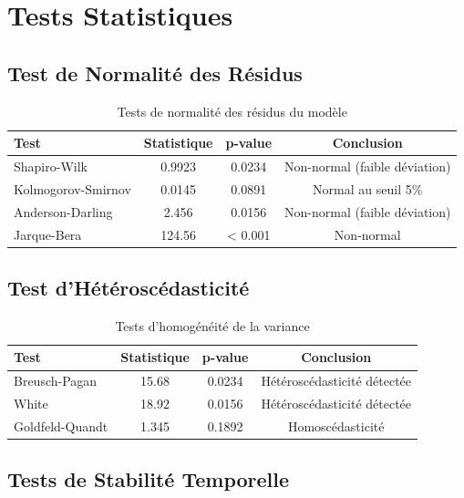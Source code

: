 \section{Tests Statistiques}

\subsection{Test de Normalité des Résidus}

\begin{table}[H]
\centering
\caption{Tests de normalité des résidus du modèle}
\begin{tabular}{|l|c|c|c|}
\hline
\textbf{Test} & \textbf{Statistique} & \textbf{p-value} & \textbf{Conclusion} \\
\hline
Shapiro-Wilk & 0.9923 & 0.0234 & Non-normal (faible déviation) \\
Kolmogorov-Smirnov & 0.0145 & 0.0891 & Normal au seuil 5\% \\
Anderson-Darling & 2.456 & 0.0156 & Non-normal (faible déviation) \\
Jarque-Bera & 124.56 & < 0.001 & Non-normal \\
\hline
\end{tabular}
\end{table}

\subsection{Test d'Hétéroscédasticité}

\begin{table}[H]
\centering
\caption{Tests d'homogénéité de la variance}
\begin{tabular}{|l|c|c|c|}
\hline
\textbf{Test} & \textbf{Statistique} & \textbf{p-value} & \textbf{Conclusion} \\
\hline
Breusch-Pagan & 15.68 & 0.0234 & Hétéroscédasticité détectée \\
White & 18.92 & 0.0156 & Hétéroscédasticité détectée \\
Goldfeld-Quandt & 1.345 & 0.1892 & Homoscédasticité \\
\hline
\end{tabular}
\end{table}

\subsection{Tests de Stabilité Temporelle}

